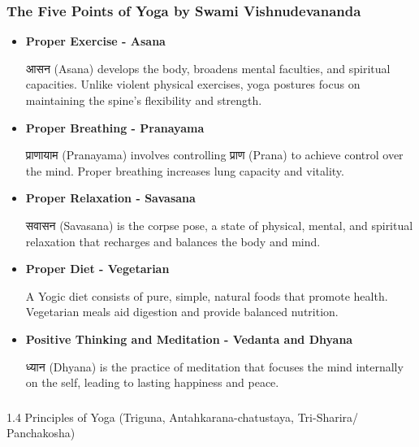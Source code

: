 \begin{frame}[fragile]\frametitle{The Five Points of Yoga by Swami Vishnudevananda}
    \begin{itemize}
        \item \textbf{Proper Exercise - Asana}
            
            आसन (Asana) develops the body, broadens mental faculties, and spiritual capacities. Unlike violent physical exercises, yoga postures focus on maintaining the spine’s flexibility and strength.
            
        \item \textbf{Proper Breathing - Pranayama}
            
            प्राणायाम (Pranayama) involves controlling प्राण (Prana) to achieve control over the mind. Proper breathing increases lung capacity and vitality.
            
        \item \textbf{Proper Relaxation - Savasana}
            
            सवासन (Savasana) is the corpse pose, a state of physical, mental, and spiritual relaxation that recharges and balances the body and mind.
            
        \item \textbf{Proper Diet - Vegetarian}
            
            A Yogic diet consists of pure, simple, natural foods that promote health. Vegetarian meals aid digestion and provide balanced nutrition.
            
        \item \textbf{Positive Thinking and Meditation - Vedanta and Dhyana}
            
            ध्यान (Dhyana) is the practice of meditation that focuses the mind internally on the self, leading to lasting happiness and peace.
            
    \end{itemize}
\end{frame}


\begin{frame}[fragile]\frametitle{}
\begin{center}
{\Large 1.4 Principles of Yoga (Triguna, Antahkarana-chatustaya, Tri-Sharira/ Panchakosha)}
\end{center}
\end{frame}

